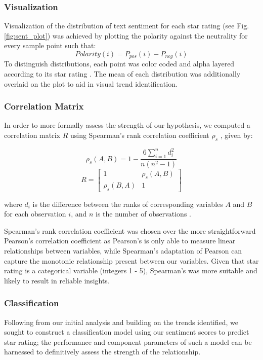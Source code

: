 \documentclass[sn-mathphys,Numbered]{sn-jnl}%
\theoremstyle{thmstyleone}%
\theoremstyle{thmstyletwo}%
\theoremstyle{thmstylethree}%
\begin{document}
\subsubsection{Visualization}
Visualization of the distribution of text sentiment for each star rating (see Fig. \ref{fig:sent_plot}) was achieved by plotting the polarity against the neutrality for every sample point such that:
\begin{equation}\label{polarity}
    Polarity(i) = P_{pos}(i) - P_{neg}(i)
\end{equation}
To distinguish distributions, each point was color coded and alpha layered according to its star rating \cite{matlab}. The mean of each distribution was additionally overlaid on the plot to aid in visual trend identification.

\subsubsection{Correlation Matrix}

In order to more formally assess the strength of our hypothesis, we computed a correlation matrix $R$ using Spearman's rank correlation coefficient $\rho_s$ \cite{seabold2010statsmodels}, given by:

\begin{equation}
\rho_s(A, B) = 1 - \frac{6 \sum_{i=1}^{n} d_i^2}{n(n^2 - 1)}
\end{equation}
\begin{equation}
R =
\begin{bmatrix}
1 & \rho_s(A, B) \\
\rho_s(B, A) & 1
\end{bmatrix}
\end{equation}

where $d_i$ is the difference between the ranks of corresponding variables $A$ and $B$ for each observation $i$, and $n$ is the number of observations \cite{fisher1958statistical}.

Spearman's rank correlation coefficient was chosen over the more straightforward Pearson's correlation coefficient as Pearson's is only able to measure linear relationships between variables, while Spearman's adaptation of Pearson can capture the monotonic relationship present between our variables. Given that star rating is a categorical variable (integers 1 - 5), Spearman's was more suitable and likely to result in reliable insights.


\subsubsection{Classification}
Following from our initial analysis and building on the trends identified, we sought to construct a classification model using our sentiment scores to predict star rating; the performance and component parameters of such a model can be harnessed to definitively assess the strength of the relationship.
\end{document}
